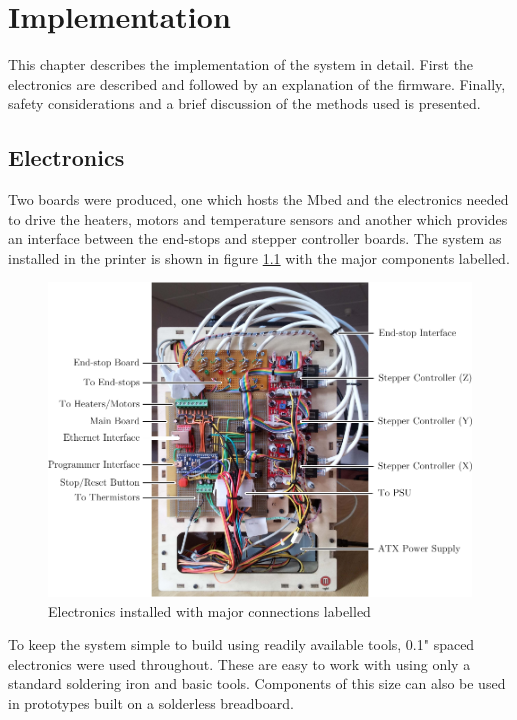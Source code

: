 \chapter{Implementation}
	
	This chapter describes the implementation of the system in detail. First the
	electronics are described and followed by an explanation of the firmware.
	Finally, safety considerations and a brief discussion of the methods used is
	presented.
	
	
	\section{Electronics}
		
		
		Two boards were produced, one which hosts the Mbed and the electronics
		needed to drive the heaters, motors and temperature sensors and another
		which provides an interface between the end-stops and stepper controller
		boards. The system as installed in the printer is shown in figure
		\ref{fig:electronicsPhoto} with the major components labelled.
		
		\begin{figure}
			\includegraphics[width=1\textwidth]{diagrams/electronicsPhoto.pdf}
			\caption{Electronics installed with major connections labelled}
			\label{fig:electronicsPhoto}
		\end{figure}
		
		To keep the system simple to build using readily available tools, 0.1"
		spaced electronics were used throughout. These are easy to work with using
		only a standard soldering iron and basic tools. Components of this size can
		also be used in prototypes built on a solderless breadboard.
		
